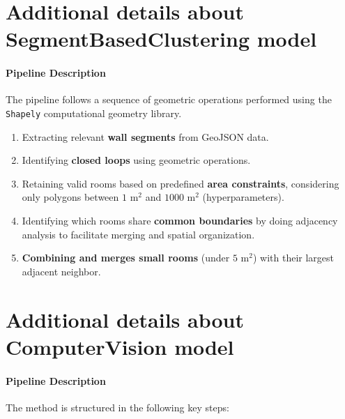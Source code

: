 \documentclass[11pt]{article}
\begin{document}

\section{Additional details about SegmentBasedClustering model}
\label{app:sec:SBCdetails}
\paragraph{Pipeline Description} The pipeline follows a sequence of geometric operations performed using the 
\texttt{Shapely} computational geometry library.

\begin{enumerate}
    \item  Extracting relevant \textbf{wall segments} from GeoJSON data.
    \item Identifying \textbf{closed loops} using geometric operations.
    \item Retaining valid rooms based on predefined \textbf{area constraints}, 
    considering only polygons between $1 \text{ m}^2$ and $1000 \text{ m}^2$ (hyperparameters).
    \item Identifying which rooms share \textbf{common boundaries} by doing adjacency 
    analysis to facilitate merging and spatial organization.
    \item \textbf{Combining and merges small rooms} (under $5 \text{ m}^2$) with their 
    largest adjacent neighbor.
\end{enumerate}


\section{Additional details about ComputerVision model}
\label{app:sec:CVdetails}
\paragraph{Pipeline Description}
The method is structured in the following key steps:
\end{document}
